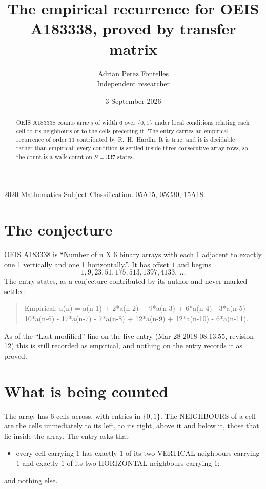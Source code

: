 \documentclass[11pt,a4paper]{article}
\title{The empirical recurrence for OEIS A183338, proved by transfer matrix}
\author{Adrian Perez Fontelles\\ \small Independent researcher}
\date{3 September 2026}
\theoremstyle{plain}
\theoremstyle{definition}
\begin{document}
\maketitle

\begin{abstract}
OEIS A183338 counts arrays of width $6$ over $\{0,1\}$ under local conditions relating each cell
to its neighbours or to the cells preceding it. The entry carries an empirical recurrence of
order $11$ contributed by R.~H.~Hardin. It is true, and it is decidable rather than
empirical: every condition is settled inside three consecutive array rows, so the count is a
walk count on $S=337$ states.
\end{abstract}

\noindent\small 2020 Mathematics Subject Classification. 05A15, 05C30, 15A18.\normalsize

\section{The conjecture}

OEIS A183338 is ``Number of n X 6 binary arrays with each 1 adjacent to exactly one 1 vertically and one 1 horizontally.''. It has offset $1$ and begins
\[
1, 9, 23, 51, 175, 513, 1397, 4133,\ \dots
\]
The entry states, as a conjecture contributed by its author and never marked settled:
\begin{quote}
Empirical: a(n) = a(n-1) + 2*a(n-2) + 9*a(n-3) + 6*a(n-4) - 3*a(n-5) - 10*a(n-6) - 17*a(n-7) - 7*a(n-8) + 12*a(n-9) + 12*a(n-10) - 6*a(n-11).
\end{quote}
As of the ``Last modified'' line on the live entry (Mar 28 2018 08:13:55, revision 12) this is still
recorded as empirical, and nothing on the entry records it as proved.

\section{What is being counted}

The array has $6$ cells across, with entries in $\{0,1\}$. The NEIGHBOURS of a cell are the
cells immediately to its left, to its right, above it and below it, those that lie inside the
array. The entry asks that
\begin{itemize}
\item every cell carrying $1$ has exactly $1$ of its two VERTICAL neighbours carrying $1$ and exactly $1$ of its two HORIZONTAL neighbours carrying $1$;
\end{itemize}
and nothing else.
\end{document}

